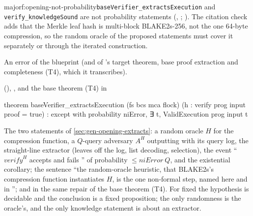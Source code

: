 \begin{finding}{major}{f:opening-not-probability}{\texttt{baseVerifier\_extractsExecution} and \texttt{verify\_knowledgeSound} are not probability statements}
  (, ;
). The citation check adds that the Merkle leaf hash is multi-block
BLAKE2s-256, not the one 64-byte compression, so the random oracle of the proposed statements must
cover it separately or through the iterated construction.

 An error of the blueprint (and of 's target
theorem, base proof extraction and completeness (T4), which it transcribes).

\begin{change}{ (), , and the base theorem (T4) in }
\asis
\begin{leancode}
theorem baseVerifier_extractsExecution (fs bcs mca flock) (h : verify prog input proof = true) :
    except with probability niError, ∃ t, ValidExecution prog input t
\end{leancode}
\asproposed The two statements of \cref{sec:gen-opening-extracts}: a random oracle $H$ for the
compression function, a $Q$-query adversary $A^H$ outputting  with its
query log, the straight-line extractor  (leaves off the log, list decoding,
selection), the event ``$\mathit{verify}^H$ accepts and  fails
'' of probability $≤ \mathit{niError}\ Q$, and the existential corollary; the
sentence ``the random-oracle heuristic, that BLAKE2s's compression function instantiates $H$, is the
one non-formal step, named here and in ''; and in
 the same repair of the base theorem (T4).
\reason For fixed  the hypothesis is decidable and the conclusion is a
fixed proposition; the only randomness is the oracle's, and the only knowledge statement is about
an extractor.
\end{change}
\end{finding}

